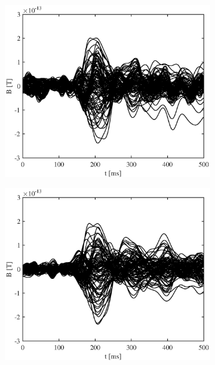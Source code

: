 \documentclass[doc,a4paper,12pt]{apa6}
\begin{document}
\begin{figure}
\begin{subfigure}[c]{0.36\textwidth}
    \label{img:butterfly:grad:sss:pa10}
  \end{subfigure}
  \captionsetup{justification=justified}
  \vspace*{3mm}
  \caption[Gemessene Aktivität an den Gradiometern]{Gemessene Aktivität an den Gradiometern für beide Versuchspersonen, jeweils in Block 1 mit Rohdaten und SSS-Daten.}
  \label{img:butterfly:grad}
  \vspace*{5mm}
  \centering
  \captionsetup{justification=centering}
  \begin{subfigure}[c]{0.36\textwidth}
    \includegraphics[width=\textwidth]{ergebnisse/butterfly/pa07a1_eve2_raw_mag_butterfly.eps}
    \label{img:butterfly:mag:raw:pa07}
  \end{subfigure}\hspace*{0.08\textwidth}
  \begin{subfigure}[c]{0.36\textwidth}
    \includegraphics[width=\textwidth]{ergebnisse/butterfly/pa07a1_eve2_sss_mag_butterfly.eps}

\end{subfigure}
\end{figure}
\end{document}
